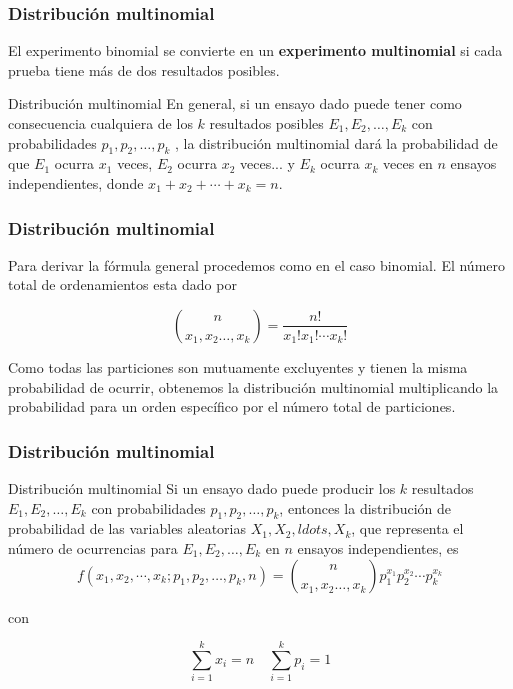 \documentclass[spanish]{beamer}
\begin{document}
\begin{frame}
\frametitle{Distribución multinomial}  
El experimento binomial se convierte en un \textbf{experimento multinomial} si cada prueba
tiene más de dos resultados posibles.
\begin{block}{Distribución multinomial}
En general, si un ensayo dado puede tener como consecuencia cualquiera de los $k$
resultados posibles $E_{1} , E_{2} ,\ldots, E_{k}$ con probabilidades $p_{1} , p_{2} ,\ldots , p_{k}$ , la distribución multinomial dará la probabilidad de que $E_{1}$ ocurra $x_{1}$ veces, $E_{2}$ ocurra $x_{2}$ veces... y $E_{k}$ ocurra $x_{k}$ veces en $n$ ensayos independientes, donde $x_{1} + x_{2} + \cdots + x_{k} = n$.
\end{block}
\end{frame}
\begin{frame}
\frametitle{Distribución multinomial}  
Para derivar la fórmula general procedemos como en el caso binomial. El número
total de ordenamientos esta dado por 

\begin{equation*}
\binom{n}{x_{1}, x_{2} \ldots , x_{k} }= \frac{n!}{x_{1}!x_{1}!\cdots x_{k}!}
\end{equation*}

Como todas las particiones son mutuamente excluyentes y tienen la misma probabilidad de ocurrir, obtenemos la distribución multinomial multiplicando la probabilidad para un orden específico por el número total de particiones.
\end{frame}
\begin{frame}
\frametitle{Distribución multinomial}  
\begin{block}{Distribución multinomial}
Si un ensayo dado puede producir los $k$ resultados $E_{1} , E_{2} ,\ldots, E_{k}$ con probabilidades $p_{1} , p_{2} ,\ldots , p_{k}$, entonces la distribución de probabilidad de las variables aleatorias $X_{1} , X_{2} ,ldots, X_{k}$, que representa el número de ocurrencias para $E_{1} , E_{2} ,\ldots, E_{k}$ en $n$ ensayos independientes,
es
\begin{equation*}
f(x_{1}, x_{2}, \cdots , x_{k}; p_{1} , p_{2} ,\ldots , p_{k}, n)= \binom{n}{x_{1}, x_{2} \ldots , x_{k} } p_{1}^{x_{1}}p_{2}^{x_{2}} \cdots p_{k}^{x_{k}}
\end{equation*}
\end{block} 
con 

\begin{equation*}
\displaystyle \sum_{i=1}^{k}x_{i}=n \quad  \sum_{i=1}^{k}p_{i}=1
\end{equation*}   
\end{frame}
\end{document}
